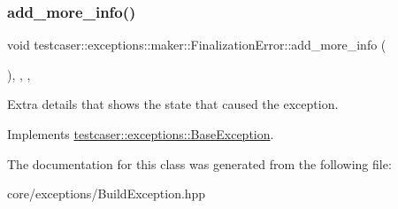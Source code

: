 \subsubsection{\texorpdfstring{add\_more\_info()}{add\_more\_info()}}
{\footnotesize\ttfamily void testcaser\+::exceptions\+::maker\+::\+Finalization\+Error\+::add\+\_\+more\+\_\+info (\begin{DoxyParamCaption}{ }\end{DoxyParamCaption})\hspace{0.3cm}{\ttfamily [inline]}, {\ttfamily [final]}, {\ttfamily [override]}, {\ttfamily [virtual]}}



Extra details that shows the state that caused the exception. 



Implements \mbox{\hyperlink{classtestcaser_1_1exceptions_1_1BaseException_ad607ea04e2cb4ad9b8d0e2e6b6734f2f}{testcaser\+::exceptions\+::\+Base\+Exception}}.



The documentation for this class was generated from the following file\+:\begin{DoxyCompactItemize}
\item 
core/exceptions/Build\+Exception.\+hpp\end{DoxyCompactItemize}
